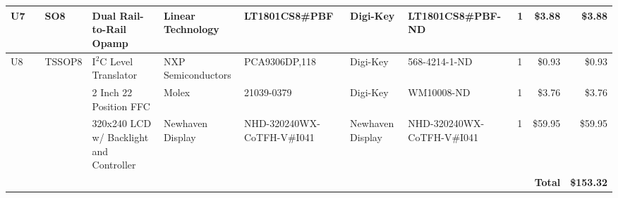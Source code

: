 \documentclass{article}
\begin{document}
\begin{center}
\begin{tabular}{| l | l | l | l | l | l | l | l | l | r | r |}
      \hline
      U7                      &                  &  SO8               &  Dual Rail-to-Rail Opamp                  &  Linear Technology      &  LT1801CS8\#PBF                 &  Digi-Key           &  LT1801CS8\#PBF-ND           &  1             &  \$3.88              &  \$3.88 \\
      \hline
      U8                      &                  &  TSSOP8            &  I$^2$C Level Translator                  &  NXP Semiconductors     &  PCA9306DP,118                  &  Digi-Key           &  568-4214-1-ND               &  1             &  \$0.93              &  \$0.93 \\
      \hline
                              &                  &                    &  2 Inch 22 Position FFC                   &  Molex                  &  21039-0379                     &  Digi-Key           &  WM10008-ND                  &  1             &  \$3.76              &  \$3.76 \\
      \hline
                              &                  &                    &  320x240 LCD w/ Backlight and Controller  &  Newhaven Display       &  NHD-320240WX-CoTFH-V\#I041     &  Newhaven Display   &  NHD-320240WX-CoTFH-V\#I041  &  1             &  \$59.95             &  \$59.95 \\
      \hline
                              &                  &                    &                                           &                         &                                 &                     &                              &                &  \textbf{Total}      &  \textbf{\$153.32} \\
      \hline
    \end{tabular}
  \end{center}
\end{document}
